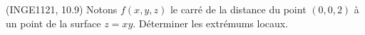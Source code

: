 
\begin{exercice}\label{exoDerrivePartielle-0010}

	(INGE1121, 10.9) Notons $f(x,y,z)$ le carré de la distance du point $(0,0,2)$ à un point de la surface $z=xy$. Déterminer les extrémums locaux.

\end{exercice}
